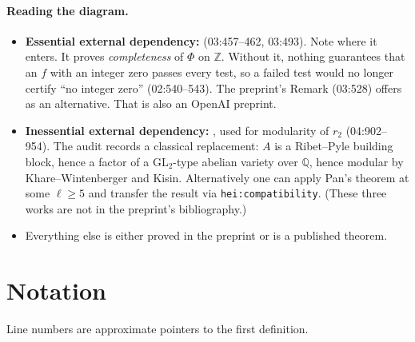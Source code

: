 \documentclass[11pt]{article}
\theoremstyle{definition}
\newcommand{\Q}{\mathbb Q}
\newcommand{\Z}{\mathbb Z}
\newcommand{\lbl}[1]{\texttt{#1}}
\newcommand{\src}[1]{\textsf{#1}}
\begin{document}
\paragraph{Reading the diagram.}
\begin{itemize}
\item \textbf{Essential external dependency:} \cite[Thm.~1.1]{PointwiseTwoConverse}
(\src{03:457--462}, \src{03:493}).  Note where it enters.  It proves
\emph{completeness} of $\Phi$ on $\Z$.  Without it, nothing guarantees
that an $f$ with an integer zero passes every test, so a failed test would
no longer certify ``no integer zero'' (\src{02:540--543}).  The preprint's Remark (\src{03:528}) offers
\cite{UnrestrictedTwoConverse} as an alternative.  That is also an OpenAI
preprint.
\item \textbf{Inessential external dependency:}
\cite[Thm.~1.1]{OddRegularFontaineMazurAtTwo}, used for modularity of
$r_2$ (\src{04:902--954}).  The audit records a classical replacement:
$A$ is a Ribet--Pyle building block, hence a factor of a $\mathrm{GL}_2$-type
abelian variety over $\Q$, hence modular by Khare--Wintenberger and Kisin.
Alternatively one can apply Pan's theorem at some $\ell\ge5$ and transfer
the result via \lbl{hei:compatibility}.  (These three works are not in the
preprint's bibliography.)
\item Everything else is either proved in the preprint or is a published
theorem.
\end{itemize}

\section{Notation}\label{sec:notation}

Line numbers are approximate pointers to the first definition.
\end{document}
